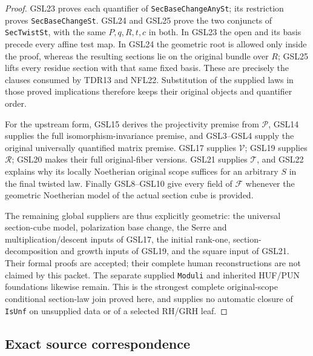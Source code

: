 \documentclass[11pt,a4paper]{article}
\numberwithin{equation}{section}
\theoremstyle{remark}\newtheorem{remark}[theorem]{Remark}
\begin{document}
\begin{proof}
GSL23 proves each quantifier of \texttt{Sec\allowbreak Base\allowbreak Change\allowbreak Any\allowbreak St};
its restriction proves \texttt{Sec\allowbreak Base\allowbreak Change\allowbreak St}.  GSL24 and
GSL25 prove the two conjuncts of \texttt{Sec\allowbreak Twist\allowbreak St}, with
the same $P,q,R,t,c$ in both.  In GSL23 the open and its
basis precede every affine test map.  In GSL24 the geometric
root is allowed only inside the proof, whereas the resulting
sections lie on the original bundle over $R$; GSL25 lifts
every residue section with that same fixed basis.  These
are precisely the clauses consumed by TDR13 and NFL22.
Substitution of the supplied laws in those proved implications
therefore keeps their original objects and quantifier order.

For the upstream form, GSL15 derives the projectivity premise
from $\mathcal P$, GSL14 supplies the full isomorphism-invariance
premise, and GSL3--GSL4 supply the original universally quantified
matrix premise.  GSL17 supplies $\mathcal V$; GSL19 supplies
$\mathcal R$; GSL20 makes their full original-fiber versions.
GSL21 supplies $\mathcal T$, and GSL22 explains why its
locally Noetherian original scope suffices for an arbitrary
$S$ in the final twisted law.  Finally GSL8--GSL10 give
every field of $\mathcal F$ whenever the geometric
Noetherian model of the actual section cube is provided.

The remaining global suppliers are thus explicitly geometric:
the universal section-cube model, polarization base change,
the Serre and multiplication/descent inputs of GSL17,
the initial rank-one, section-decomposition and growth inputs
of GSL19, and the square input of GSL21.  Their formal proofs
are accepted; their complete human reconstructions are not
claimed by this packet.  The separate supplied \texttt{Moduli}
and inherited HUF/PUN foundations likewise remain.  This is
the strongest complete original-scope conditional section-law
join proved here, and supplies no automatic closure of
\texttt{Is\allowbreak Unf} on unsupplied data or of a selected RH/GRH leaf.
\end{proof}

\subsection*{Exact source correspondence}
\end{document}
